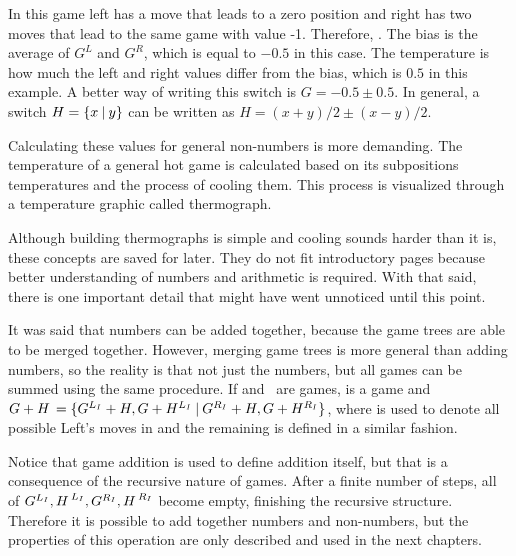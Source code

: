 In this game left has a move that leads to a zero position and right has two moves that lead to the same game with value -1. Therefore, . The bias is the average of $G^L$ and $G^R$, which is equal to $-0.5$ in this case. The temperature is how much the left and right values differ from the bias, which is $0.5$ in this example. A better way of writing this switch is $G = -0.5 \pm 0.5$. In general, a switch $H = \mbox{$\{x\:|\:y\}$}$ can be written as $H = (x+y)/2 \pm (x-y)/2$. 

Calculating these values for general non-numbers is more demanding. The temperature of a general hot game is calculated based on its subpositions temperatures and the process of cooling them. This process is visualized through a temperature graphic called thermograph.

Although building thermographs is simple and cooling sounds harder than it is, these concepts are saved for later. They do not fit introductory pages because better understanding of numbers and arithmetic is required. With that said, there is one important detail that might have went unnoticed until this point.

It was said that numbers can be added together, because the game trees are able to be merged together. However, merging game trees is more general than adding numbers, so the reality is that not just the numbers, but all games can be summed using the same procedure. If \Gm{} and \Hm$\,$ are games, \Gm{ + \Hm} is a game and $\mbox{$G + \mbox{$H\,$} = \mbox{$\{G^{L_I}+H, G+H^{L_I}\:|\:G^{R_I}+H, G+H^{R_I}\}$}$}$, where  is used to denote all possible Left's moves in \Gm{} and the remaining is defined in a similar fashion.

Notice that game addition is used to define addition itself, but that is a consequence of the recursive nature of games. After a finite number of steps, all of $\mbox{$G^{L_I}$}, \mbox{$H\,$}^{L_I}, \mbox{$G^{R_I}$}, \mbox{$H\,$}^{R_I}$ become empty, finishing the recursive structure. Therefore it is possible to add together numbers and non-numbers, but the properties of this operation are only described and used in the next chapters.







